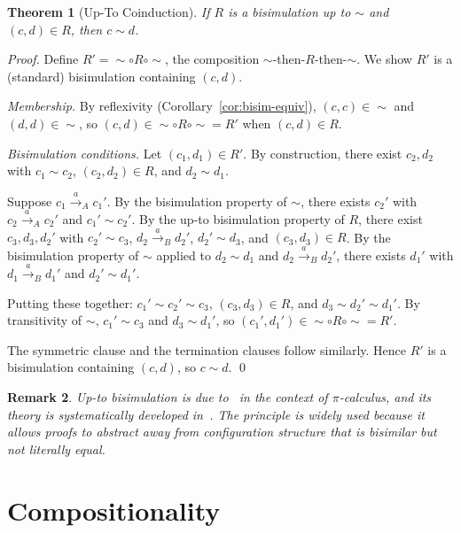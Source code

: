 \documentclass[twocolumn,11pt,a4paper]{article}
\newtheorem{theorem}{Theorem}[section]
\newtheorem{remark}[theorem]{Remark}
\newcommand{\bisim}{\sim}
\begin{document}
\begin{theorem}[Up-To Coinduction]
\label{thm:up-to}
If $R$ is a bisimulation up to $\bisim$ and $(c, d) \in R$, then $c \bisim d$.
\end{theorem}

\begin{proof}
Define $R' = \bisim \circ R \circ \bisim$, the composition $\bisim$-then-$R$-then-$\bisim$. We show $R'$ is a (standard) bisimulation containing $(c, d)$.

\emph{Membership.} By reflexivity (Corollary~\ref{cor:bisim-equiv}), $(c, c) \in \bisim$ and $(d, d) \in \bisim$, so $(c, d) \in \bisim \circ R \circ \bisim = R'$ when $(c, d) \in R$.

\emph{Bisimulation conditions.} Let $(c_1, d_1) \in R'$. By construction, there exist $c_2, d_2$ with $c_1 \bisim c_2$, $(c_2, d_2) \in R$, and $d_2 \bisim d_1$.

Suppose $c_1 \xrightarrow{a}_A c_1'$. By the bisimulation property of $\bisim$, there exists $c_2'$ with $c_2 \xrightarrow{a}_A c_2'$ and $c_1' \bisim c_2'$. By the up-to bisimulation property of $R$, there exist $c_3, d_3, d_2'$ with $c_2' \bisim c_3$, $d_2 \xrightarrow{a}_B d_2'$, $d_2' \bisim d_3$, and $(c_3, d_3) \in R$. By the bisimulation property of $\bisim$ applied to $d_2 \bisim d_1$ and $d_2 \xrightarrow{a}_B d_2'$, there exists $d_1'$ with $d_1 \xrightarrow{a}_B d_1'$ and $d_2' \bisim d_1'$.

Putting these together: $c_1' \bisim c_2' \bisim c_3$, $(c_3, d_3) \in R$, and $d_3 \bisim d_2' \bisim d_1'$. By transitivity of $\bisim$, $c_1' \bisim c_3$ and $d_3 \bisim d_1'$, so $(c_1', d_1') \in \bisim \circ R \circ \bisim = R'$.

The symmetric clause and the termination clauses follow similarly. Hence $R'$ is a bisimulation containing $(c, d)$, so $c \bisim d$. \qed
\end{proof}

\begin{remark}
Up-to bisimulation is due to~\citet{milner1989sangiorgi} in the context of $\pi$-calculus, and its theory is systematically developed in~\citet{sangiorgi2011advanced}. The principle is widely used because it allows proofs to abstract away from configuration structure that is bisimilar but not literally equal.
\end{remark}

\section{Compositionality}
\label{sec:composition}
\end{document}
